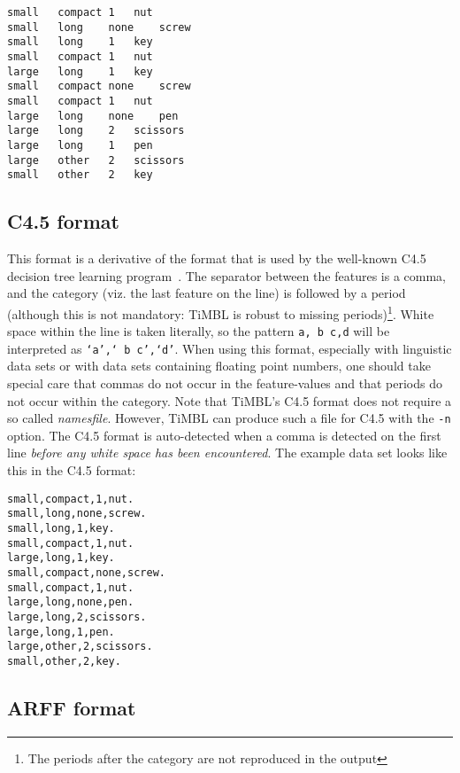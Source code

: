 \documentclass{report}
\begin{document}
\begin{verbatim}
small	compact	1	nut
small	long	none	screw
small	long	1	key
small	compact	1	nut
large	long	1	key
small	compact	none	screw
small	compact	1	nut
large	long	none	pen
large	long	2	scissors
large	long	1	pen
large	other	2	scissors
small	other	2	key
\end{verbatim}

\subsection{C4.5 format}
\label{c45format}

This format is a derivative of the format that is used by the
well-known C4.5 decision tree learning program~\cite{Quinlan93}.  The
separator between the features is a comma, and the category (viz.  the
last feature on the line) is followed by a period (although this is
not mandatory: TiMBL is robust to missing periods)\footnote{The
periods after the category are not reproduced in the output}.  White
space within the line is taken literally, so the pattern {\tt a, b
c,d} will be interpreted as {\tt `a',` b c',`d'}.  When using this
format, especially with linguistic data sets or with data sets
containing floating point numbers, one should take special care that
commas do not occur in the feature-values and that periods do not
occur within the category.  Note that TiMBL's C4.5 format does not
require a so called {\em namesfile}.  However, TiMBL can produce such
a file for C4.5 with the {\tt -n} option.  The C4.5 format is
auto-detected when a comma is detected on the first line {\em before
any white space has been encountered}. The example data set looks like
this in the C4.5 format:

\begin{verbatim}
small,compact,1,nut.
small,long,none,screw.
small,long,1,key.
small,compact,1,nut.
large,long,1,key.
small,compact,none,screw.
small,compact,1,nut.
large,long,none,pen.
large,long,2,scissors.
large,long,1,pen.
large,other,2,scissors.
small,other,2,key.
\end{verbatim}

\subsection{ARFF format}
\label{arffformat}
\end{document}
